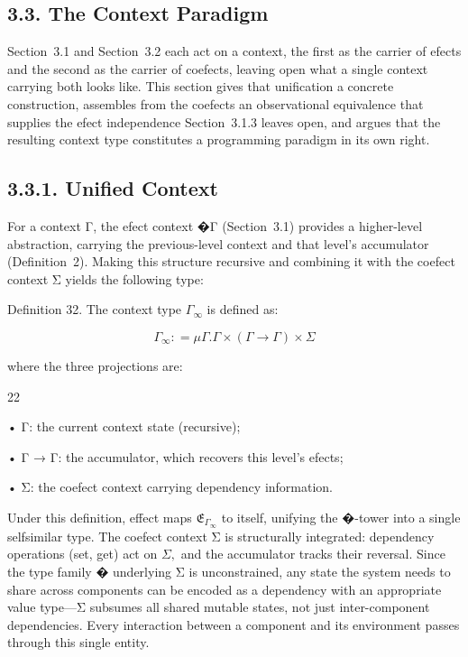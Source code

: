 \documentclass[
  10
]{article}
\begin{document}
\subsection{3.3. The Context Paradigm}\label{the-context-paradigm}

Section~3.1 and Section~3.2 each act on a context, the first as the
carrier of efects and the second as the carrier of coefects, leaving
open what a single context carrying both looks like. This section gives
that unification a concrete construction, assembles from the coefects an
observational equivalence that supplies the efect independence
Section~3.1.3 leaves open, and argues that the resulting context type
constitutes a programming paradigm in its own right.

\subsection{3.3.1. Unified Context}\label{unified-context}

For a context Γ, the efect context �Γ (Section~3.1) provides a
higher-level abstraction, carrying the previous-level context and that
level's accumulator (Definition~2). Making this structure recursive and
combining it with the coefect context Σ yields the following type:

Definition 32. The context type \(\Gamma _ { \infty }\) is defined as:

\[
\Gamma _ { \infty } : = \mu \Gamma . \Gamma \times ( \Gamma \to \Gamma ) \times \Sigma\tag{31}
\]

where the three projections are:

22

• Γ: the current context state (recursive);

• Γ → Γ: the accumulator, which recovers this level's efects;

• Σ: the coefect context carrying dependency information.

Under this definition, effect maps
\({ \mathfrak { E } } _ { \Gamma _ { \infty } }\) to itself, unifying
the �-tower into a single selfsimilar type. The coefect context Σ is
structurally integrated: dependency operations (set, get) act on
\(\Sigma ,\) and the accumulator tracks their reversal. Since the type
family �︀ underlying Σ is unconstrained, any state the system needs to
share across components can be encoded as a dependency with an
appropriate value type---Σ subsumes all shared mutable states, not just
inter-component dependencies. Every interaction between a component and
its environment passes through this single entity.
\end{document}
